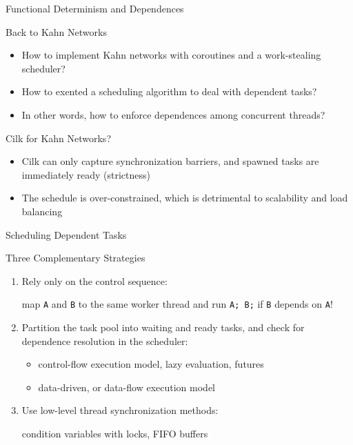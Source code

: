 \documentclass[xcolor=dvipsnames,9pt,mathserif]{beamer}
\renewcommand{\emph}[1]{\alert{#1}}
\begin{document}
\begin{frame}{Functional Determinism and Dependences}
  \begin{block}{Back to Kahn Networks}
    \begin{itemize}
    \item How to implement Kahn networks with coroutines and a
      work-stealing scheduler?
    \item How to exented a scheduling algorithm to deal with
      \emph{dependent tasks}?
    \item In other words, how to enforce \emph{dependences} among
      concurrent threads?
    \end{itemize}
  \end{block}
  
  \begin{block}{Cilk for Kahn Networks?}
    \begin{itemize}
    \item Cilk can only capture synchronization barriers, and spawned
      tasks are immediately ready (strictness)
    \item The schedule is over-constrained, which is detrimental to
      scalability and load balancing
    \end{itemize}
  \end{block}
\end{frame}

\begin{frame}{Scheduling Dependent Tasks}
  \begin{block}{Three Complementary Strategies}
    \begin{enumerate}
    \item Rely only on the control sequence:

      map \texttt{A} and \texttt{B} to the same worker thread and
      run \texttt{A; B;} if \texttt{B} depends on \texttt{A}!

      \bigskip
    \item Partition the task pool into waiting and ready tasks, and
      check for dependence resolution in the scheduler:

      \begin{itemize}
      \item \emph{control-flow} execution model, lazy evaluation, futures
      \item \emph{data-driven}, or \emph{data-flow} execution model
      \end{itemize}

      \bigskip
    \item Use low-level thread synchronization methods:

      condition variables with locks, FIFO buffers
    \end{enumerate}
  \end{block}
\end{frame}
\end{document}
